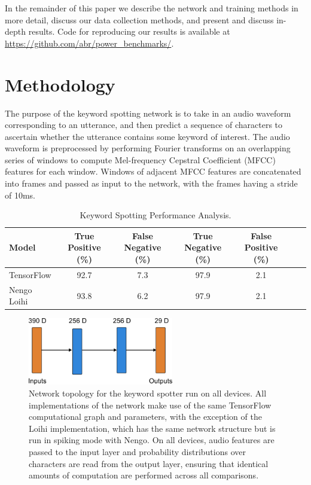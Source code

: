 \documentclass{article}
\begin{document}
In the remainder of this paper we describe the network and training methods in more detail, discuss our data collection methods, and present and discuss in-depth results. Code for reproducing our results is available at \url{https://github.com/abr/power\_benchmarks/}.

\section{Methodology}


The purpose of the keyword spotting network is to take in an audio waveform corresponding to an utterance, and then predict a sequence of characters to ascertain whether the utterance contains some keyword of interest. The audio waveform is preprocessed by performing Fourier transforms on an overlapping series of windows to compute Mel-frequency Cepstral Coefficient (MFCC) features for each window. Windows of adjacent MFCC features are concatenated into frames and passed as input to the network, with the frames having a stride of 10ms.  

\begin{table}[t!]
\caption{Keyword Spotting Performance Analysis.} 
\vskip 0.15in
\begin{center}
\begin{small}
\begin{sc}
\begin{tabular}{lcccccc}
\hline
\abovespace\belowspace
Model & True Positive (\%) & False Negative (\%) & True Negative (\%) & False Positive (\%) \\
\hline
\abovespace
TensorFlow & 92.7 & 7.3 & 97.9 & 2.1 \\   
\belowspace
Nengo Loihi & 93.8 & 6.2 & 97.9 & 2.1 \\

\hline
\end{tabular}
\end{sc}
\end{small}
\end{center}
\vskip -0.1in
\label{acc-table}
\end{table}


\begin{figure}[ht!]
\centering
    \includegraphics[width=2.5in]{./figures/network.png}
    \caption{Network topology for the keyword spotter run on all devices. All implementations of the network make use of the same TensorFlow computational graph and parameters, with the exception of the Loihi implementation, which has the same network structure but is run in spiking mode with Nengo. On all devices, audio features are passed to the input layer and probability distributions over characters are read from the output layer, ensuring that identical amounts of computation are performed across all comparisons.}
\label{network_fig}
\end{figure}
\end{document}
